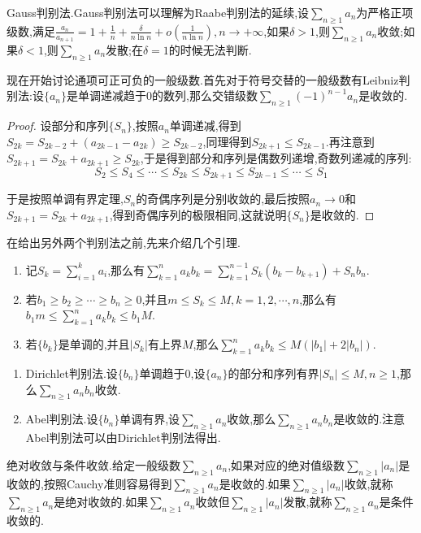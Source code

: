 Gauss判别法.Gauss判别法可以理解为Raabe判别法的延续,设$\sum_{n\ge1}a_n$为严格正项级数,满足$\frac{a_n}{a_{n+1}}=1+\frac{1}{n}+\frac{\delta}{n\ln n}+o(\frac{1}{n\ln n}),n\to+\infty$,如果$\delta>1$,则$\sum_{n\ge1}a_n$收敛;如果$\delta<1$,则$\sum_{n\ge1}a_n$发散;在$\delta=1$的时候无法判断.

现在开始讨论通项可正可负的一般级数.首先对于符号交替的一般级数有Leibniz判别法:设$\{a_n\}$是单调递减趋于0的数列,那么交错级数$\sum_{n\ge1}(-1)^{n-1}a_n$是收敛的.
\begin{proof}
	
	设部分和序列$\{S_n\}$,按照$a_n$单调递减,得到$S_{2k}=S_{2k-2}+(a_{2k-1}-a_{2k})\ge S_{2k-2}$,同理得到$S_{2k+1}\le S_{2k-1}$.再注意到$S_{2k+1}=S_{2k}+a_{2k+1}\ge S_{2k}$,于是得到部分和序列是偶数列递增,奇数列递减的序列:
	$$S_2\le S_4\le\cdots\le S_{2k}\le S_{2k+1}\le S_{2k-1}\le\cdots\le S_1$$
	
	于是按照单调有界定理,$S_n$的奇偶序列是分别收敛的,最后按照$a_n\to0$和$S_{2k+1}=S_{2k}+a_{2k+1}$,得到奇偶序列的极限相同,这就说明$\{S_n\}$是收敛的.
	
\end{proof}

在给出另外两个判别法之前,先来介绍几个引理.
\begin{enumerate}
	\item 记$S_k=\sum_{i=1}^{k}a_i$,那么有$\sum_{k=1}^{n}a_kb_k=\sum_{k=1}^{n-1}S_k(b_k-b_{k+1})+S_nb_n$.
	\item 若$b_1\ge b_2\ge\cdots\ge b_n\ge0$,并且$m\le S_k\le M,k=1,2,\cdots,n$,那么有$b_1m\le\sum_{k=1}^{n}a_kb_k\le b_1M$.
	\item 若$\{b_k\}$是单调的,并且$|S_k|$有上界$M$,那么$\sum_{k=1}^{n}a_kb_k\le M\left(|b_1|+2|b_n|\right)$.
\end{enumerate}

\begin{enumerate}
	\item Dirichlet判别法.设$\{b_n\}$单调趋于0,设$\{a_n\}$的部分和序列有界$|S_n|\le M,n\ge1$,那么$\sum_{n\ge1}a_nb_n$收敛.
	\item Abel判别法.设$\{b_n\}$单调有界,设$\sum_{n\ge1}a_n$收敛,那么$\sum_{n\ge1}a_nb_n$是收敛的.注意Abel判别法可以由Dirichlet判别法得出.
\end{enumerate}

绝对收敛与条件收敛.给定一般级数$\sum_{n\ge1}a_n$,如果对应的绝对值级数$\sum_{n\ge1}|a_n|$是收敛的,按照Cauchy准则容易得到$\sum_{n\ge1}a_n$是收敛的.如果$\sum_{n\ge1}|a_n|$收敛,就称$\sum_{n\ge1}a_n$是绝对收敛的.如果$\sum_{n\ge1}a_n$收敛但$\sum_{n\ge1}|a_n|$发散,就称$\sum_{n\ge1}a_n$是条件收敛的.

